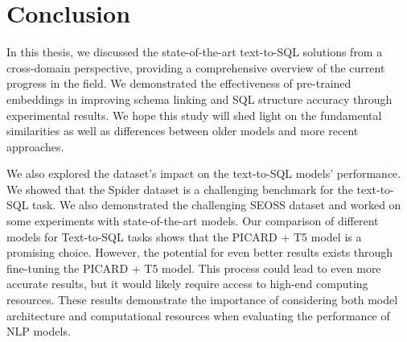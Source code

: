 \section{Conclusion}




% 
% 
% 


In this thesis, we discussed the state-of-the-art text-to-SQL solutions from a cross-domain perspective, providing a comprehensive overview of the current progress in the field. We demonstrated the effectiveness of pre-trained embeddings in improving schema linking and SQL structure accuracy through experimental results. We hope this study will shed light on the fundamental similarities as well as differences between older models and more recent approaches.

We also explored the dataset's impact on the text-to-SQL models' performance. We showed that the Spider dataset is a challenging benchmark for the text-to-SQL task. We also demonstrated the challenging SEOSS dataset and worked on some experiments with state-of-the-art models. Our comparison of different models for Text-to-SQL tasks shows that the PICARD + T5 model is a promising choice. However, the potential for even better results exists through fine-tuning the PICARD + T5 model. This process could lead to even more accurate results, but it would likely require access to high-end computing resources. These results demonstrate the importance of considering both model architecture and computational resources when evaluating the performance of NLP models.


